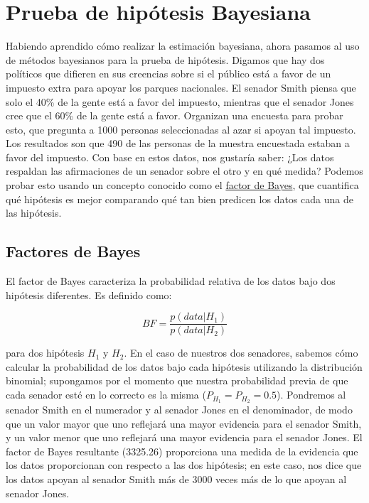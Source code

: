 \documentclass[
  12pt,
]{book}
\begin{document}
\hypertarget{prueba-de-hipuxf3tesis-bayesiana}{%
\section{Prueba de hipótesis Bayesiana}\label{prueba-de-hipuxf3tesis-bayesiana}}

Habiendo aprendido cómo realizar la estimación bayesiana, ahora pasamos al uso de métodos bayesianos para la prueba de hipótesis. Digamos que hay dos políticos que difieren en sus creencias sobre si el público está a favor de un impuesto extra para apoyar los parques nacionales. El senador Smith piensa que solo el 40\% de la gente está a favor del impuesto, mientras que el senador Jones cree que el 60\% de la gente está a favor. Organizan una encuesta para probar esto, que pregunta a 1000 personas seleccionadas al azar si apoyan tal impuesto. Los resultados son que 490 de las personas de la muestra encuestada estaban a favor del impuesto. Con base en estos datos, nos gustaría saber: ¿Los datos respaldan las afirmaciones de un senador sobre el otro y en qué medida? Podemos probar esto usando un concepto conocido como el \href{https://bayesfactor.blogspot.com/2014/02/the-bayesfactor-package-this-blog-is.html}{factor de Bayes}, que cuantifica qué hipótesis es mejor comparando qué tan bien predicen los datos cada una de las hipótesis.

\hypertarget{Bayes-factors}{%
\subsection{Factores de Bayes}\label{Bayes-factors}}

El factor de Bayes caracteriza la probabilidad relativa de los datos bajo dos hipótesis diferentes. Es definido como:

\[
BF = \frac{p(data|H_1)}{p(data|H_2)}
\]

para dos hipótesis \(H_1\) y \(H_2\). En el caso de nuestros dos senadores, sabemos cómo calcular la probabilidad de los datos bajo cada hipótesis utilizando la distribución binomial; supongamos por el momento que nuestra probabilidad previa de que cada senador esté en lo correcto es la misma (\(P_{H_1} = P_{H_2} = 0.5\)). Pondremos al senador Smith en el numerador y al senador Jones en el denominador, de modo que un valor mayor que uno reflejará una mayor evidencia para el senador Smith, y un valor menor que uno reflejará una mayor evidencia para el senador Jones. El factor de Bayes resultante (3325.26) proporciona una medida de la evidencia que los datos proporcionan con respecto a las dos hipótesis; en este caso, nos dice que los datos apoyan al senador Smith más de 3000 veces más de lo que apoyan al senador Jones.
\end{document}
